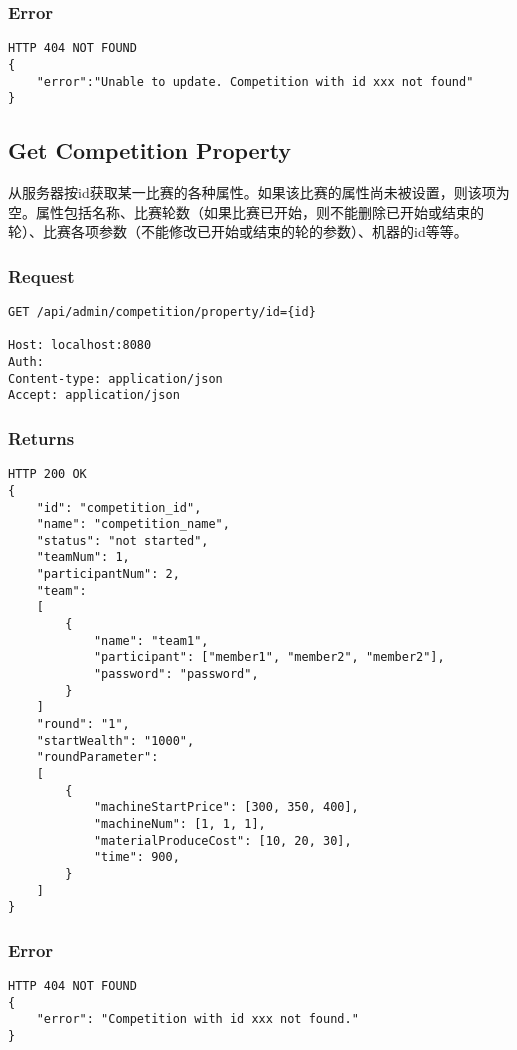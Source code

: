 \documentclass{article}
\begin{document}
\subsubsection*{Error}
\begin{lstlisting}
HTTP 404 NOT FOUND
{
    "error":"Unable to update. Competition with id xxx not found"
}
\end{lstlisting}


\subsection{Get Competition Property}

从服务器按id获取某一比赛的各种属性。如果该比赛的属性尚未被设置，则该项为空。属性包括名称、比赛轮数（如果比赛已开始，则不能删除已开始或结束的轮）、比赛各项参数（不能修改已开始或结束的轮的参数）、机器的id等等。

\subsubsection*{Request}
\begin{lstlisting}
GET /api/admin/competition/property/id={id}

Host: localhost:8080
Auth:
Content-type: application/json
Accept: application/json
\end{lstlisting}

\subsubsection*{Returns}
\begin{lstlisting}
HTTP 200 OK
{
    "id": "competition_id",
    "name": "competition_name",
    "status": "not started",
    "teamNum": 1,
    "participantNum": 2,
    "team":
    [
        {
            "name": "team1",
            "participant": ["member1", "member2", "member2"],
            "password": "password",
        }
    ]
    "round": "1",
    "startWealth": "1000",
    "roundParameter":
    [
        {
            "machineStartPrice": [300, 350, 400],
            "machineNum": [1, 1, 1],
            "materialProduceCost": [10, 20, 30],
            "time": 900,
        }
    ]
}

\end{lstlisting}

\subsubsection*{Error}
\begin{lstlisting}
HTTP 404 NOT FOUND
{
    "error": "Competition with id xxx not found."
}
\end{lstlisting}
\end{document}
